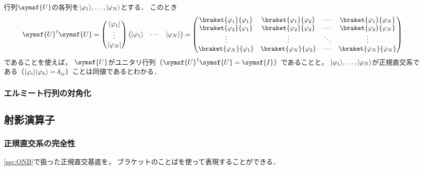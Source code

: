 \documentclass[
]{sotsu}
\begin{document}
\quad 
行列$\symsf{U}$の各列を$\lvert\varphi_1\rangle, \dots, \lvert\varphi_N\rangle$とする．
このとき
\begin{equation*}
    \adjoint{\symsf{U}} \symsf{U} 
    =
    \begin{pmatrix}
        \bra{\varphi_1}  \\  \vdots  \\  \bra{\varphi_N}
    \end{pmatrix}
    \begin{pmatrix}
        \ket{\varphi_1}  &  \cdots  &  \ket{\varphi_N}
    \end{pmatrix}
    = 
    \begin{pmatrix}
        \braket{\varphi_1}{\varphi_1}  &  \braket{\varphi_1}{\varphi_2}  &  \cdots  &  \braket{\varphi_1}{\varphi_N}  \\
        \braket{\varphi_2}{\varphi_1}  &  \braket{\varphi_2}{\varphi_2}  &  \cdots  &  \braket{\varphi_2}{\varphi_N}  \\
        \vdots  &  \vdots  &  \ddots  &  \vdots  \\
        \braket{\varphi_N}{\varphi_1}  &  \braket{\varphi_N}{\varphi_2}  &  \cdots  &  \braket{\varphi_N}{\varphi_N}  \\
    \end{pmatrix}
\end{equation*}
であることを使えば，
$\symsf{U}$がユニタリ行列（$\adjoint{\symsf{U}} \symsf{U} = \symsf{I}$）であることと，
$\lvert\varphi_1\rangle, \dots, \lvert\varphi_N\rangle$が正規直交系である（$\lvert\varphi_i\rangle \lvert\varphi_h\rangle = \delta_{ij}$）ことは同値であるとわかる．




\subsubsection{エルミート行列の対角化}




\subsection{射影演算子}

\subsubsection{正規直交系の完全性}
\label{sec:complete-orthonormal-system}

\cref{sec:ONB}で扱った正規直交基底を，
ブラケットのことばを使って表現することができる．
\end{document}
